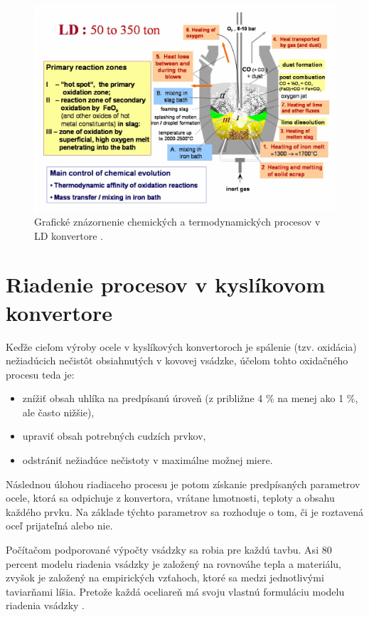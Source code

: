 \documentclass[]{tukediphc}
\begin{document}
\begin{figure}[h!]
	\centering
	\includegraphics[width=1\textwidth,angle=0]{figures/ld-convertor-processes-graphical.jpg}
	\caption{Grafické znázornenie chemických a termodynamických procesov v LD konvertore \citep{Jalkanen2006}.}
\end{figure}

\section{Riadenie procesov v kyslíkovom konvertore}

Keďže cieľom výroby ocele v kyslíkových konvertoroch je spálenie (tzv. oxidácia) nežiadúcich nečistôt obsiahnutých v kovovej vsádzke, účelom tohto oxidačného procesu teda je:

\begin{itemize}
	\item znížiť obsah uhlíka na predpísanú úroveň (z približne 4 \% na menej ako 1 \%, ale často nižšie),
	\item upraviť obsah potrebných cudzích prvkov,
	\item odstrániť nežiadúce nečistoty v maximálne možnej miere.
\end{itemize}

Následnou úlohou riadiaceho procesu je potom získanie predpísaných parametrov ocele, ktorá sa odpichuje z konvertora, vrátane hmotnosti, teploty a obsahu každého prvku. Na základe týchto parametrov sa rozhoduje o tom, či je roztavená oceľ prijateľná alebo nie.

Počítačom podporované výpočty vsádzky sa robia pre každú tavbu. Asi 80 percent modelu riadenia vsádzky je založený na rovnováhe tepla a materiálu, zvyšok je založený na empirických vzťahoch, ktoré sa medzi jednotlivými taviarňami líšia. Pretože každá oceliareň má svoju vlastnú formuláciu modelu riadenia vsádzky \cite{Turkdogan1996}.



%

%
\end{document}
